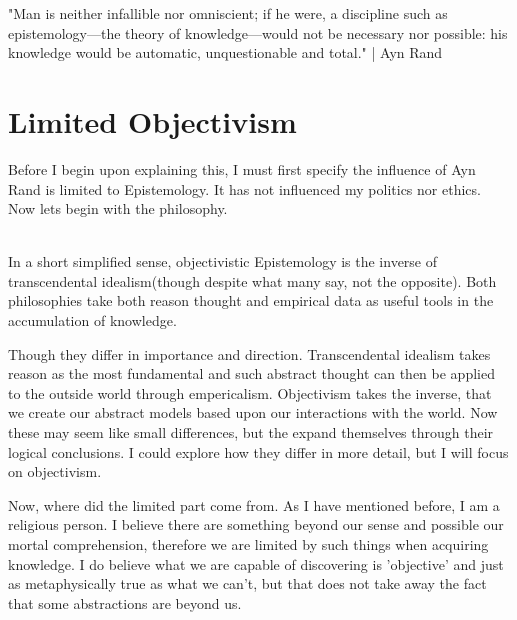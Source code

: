 "Man is neither infallible nor omniscient; if he were, a discipline such as epistemology—the theory of knowledge—would not be necessary nor possible: his knowledge would be automatic, unquestionable and total." | Ayn Rand
\section{Limited Objectivism}
\par Before I begin upon explaining this, I must first specify the influence of Ayn Rand is limited to Epistemology. It has not influenced my politics nor ethics. Now lets begin with the philosophy.
\\
\\
\par In a short simplified sense, objectivistic Epistemology is the inverse of transcendental idealism(though despite what many say, not the opposite). Both philosophies take both reason thought and empirical data as useful tools in the accumulation of knowledge.
\par Though they differ in importance and direction. Transcendental idealism takes reason as the most fundamental and such abstract thought can then be applied to the outside world through empericalism. Objectivism takes the inverse, that we create our abstract models based upon our interactions with the world. Now these may seem like small differences, but the expand themselves through their logical conclusions. I could explore how they differ in more detail, but I will focus on objectivism.

\par Now, where did the limited part come from. As I have mentioned before, I am a religious person. I believe there are something beyond our sense and possible our mortal comprehension, therefore we are limited by such things when acquiring knowledge. I do believe what we are capable of discovering is 'objective' and just as metaphysically true as what we can't, but that does not take away the fact that some abstractions are beyond us.

